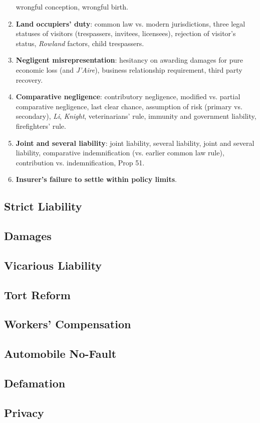\begin{enumerate}
    wrongful conception, wrongful birth.
    \item \textbf{Land occupiers' duty}: common law vs. modern jurisdictions, 
    three legal statuses of visitors (trespassers, invitees, licensees), 
    rejection of visitor's status, \emph{Rowland} factors, child trespassers.
    \item \textbf{Negligent misrepresentation}: hesitancy on awarding damages 
    for pure economic loss (and \emph{J'Aire}), business relationship 
    requirement, third party recovery.
    \item \textbf{Comparative negligence}: contributory negligence, modified 
    vs. partial comparative negligence, last clear chance, assumption of risk 
    (primary vs. secondary), \emph{Li}, \emph{Knight}, veterinarians' rule, 
    immunity and government liability, firefighters' rule.
    \item \textbf{Joint and several liability}: joint liability, several 
    liability, joint and several liability, comparative indemnification (vs. 
    earlier common law rule), contribution vs. indemnification, Prop 51.
    \item \textbf{Insurer's failure to settle within policy limits}.
\end{enumerate}

\subsection{Strict Liability}
\subsection{Damages}
\subsection{Vicarious Liability}
\subsection{Tort Reform}
\subsection{Workers' Compensation}
\subsection{Automobile No-Fault}
\subsection{Defamation}
\subsection{Privacy}
